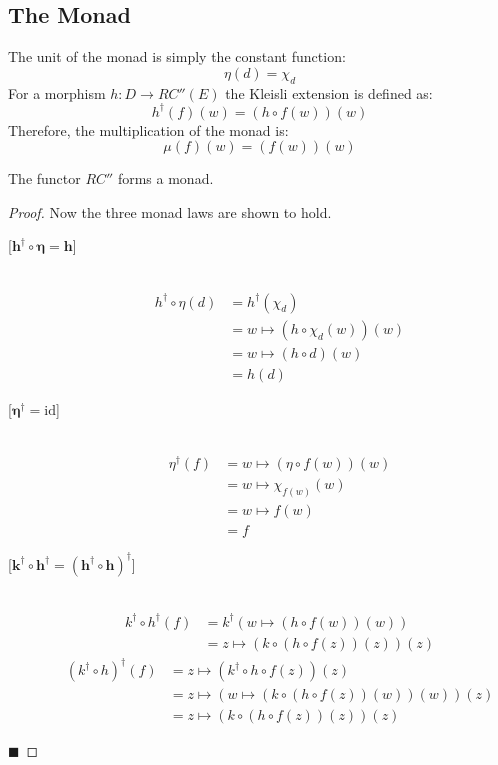 \subsection{The Monad}

The unit of the monad is simply the constant function:
\[\eta(d) = \chi_d\]
For a morphism $h:D\to RC''(E)$ the Kleisli extension is defined as:
\[h^{\dagger}(f)(w) = (h\circ f(w))(w)\]
Therefore, the multiplication of the monad is:
\[\mu(f)(w) = (f(w))(w)\]

\begin{theorem}
The functor $RC''$ forms a monad.
\end{theorem}
\begin{proof} 
Now the three monad laws are shown to hold.
\begin{description}
\item[{[}$\boldsymbol{h^\dagger\circ \eta = h}${]}] \hfill \\
\begin{align*}
h^\dagger\circ\eta(d) &= h^\dagger(\chi_d) \\
&= w\mapsto (h\circ \chi_d(w))(w) \\
&= w\mapsto (h\circ d)(w) \\
&= h(d)
\end{align*}
\newpage
\item[{[}$\boldsymbol{\eta^\dagger = \mathrm{id}}${]}] \hfill \\
\begin{align*}
\eta^\dagger(f) &= w\mapsto (\eta\circ f(w))(w) \\
&= w \mapsto \chi_{f(w)}(w) \\
&= w \mapsto f(w) \\
&= f
\end{align*}
\item[{[}$\boldsymbol{k^\dagger\circ h^\dagger = (h^\dagger\circ h)^\dagger}${]}] \hfill \\
\begin{align*}
k^\dagger\circ h^\dagger(f) 
&= k^\dagger(w\mapsto (h\circ f(w))(w)) \\
&= z\mapsto (k\circ (h\circ f(z))(z))(z)
\end{align*}
\begin{align*}
(k^\dagger\circ h)^\dagger (f)
&= z\mapsto (k^\dagger\circ h\circ f(z))(z) \\
&= z\mapsto (w\mapsto (k\circ (h\circ f(z))(w))(w))(z) \\
&= z\mapsto (k\circ (h\circ f(z))(z))(z)
\end{align*}
\end{description} \hfill $\blacksquare$
\end{proof}

